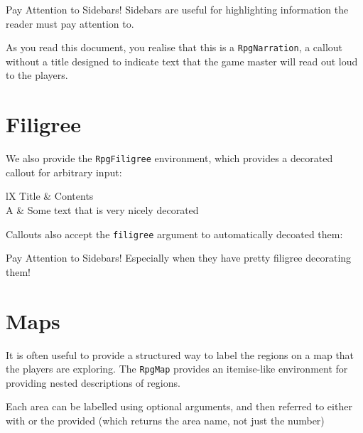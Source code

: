 		\begin{RpgSidebar}[]{Pay Attention to Sidebars!}
			Sidebars are useful for highlighting information the reader must pay attention to.
		\end{RpgSidebar}
		\begin{RpgNarration}
			As you read this document, you realise that this is a \texttt{RpgNarration}, a callout without a title designed to indicate text that the game master will read out loud to the players.
		\end{RpgNarration}

	\section{Filigree}

		We also provide the \texttt{RpgFiligree} environment, which provides a decorated callout for arbitrary input:

		\begin{RpgFiligree}[opacityback=0.3]
			\begin{RpgTable}{lX}
				Title & Contents
				\\
				A & Some text that is very nicely decorated
			\end{RpgTable}
		\end{RpgFiligree}

		Callouts also accept the \texttt{filigree} argument to automatically decoated them:
		\begin{RpgSidebar}[filigree]{Pay Attention to Sidebars!}
			Especially when they have pretty filigree decorating them!
		\end{RpgSidebar}
	\section{Maps}

		It is often useful to provide a structured way to label the regions on a map that the players are exploring. The \texttt{RpgMap} provides an itemise-like environment for providing nested descriptions of regions.

		Each area can be labelled using optional arguments, and then referred to either with  or the provided  (which returns the area name, not just the number)

